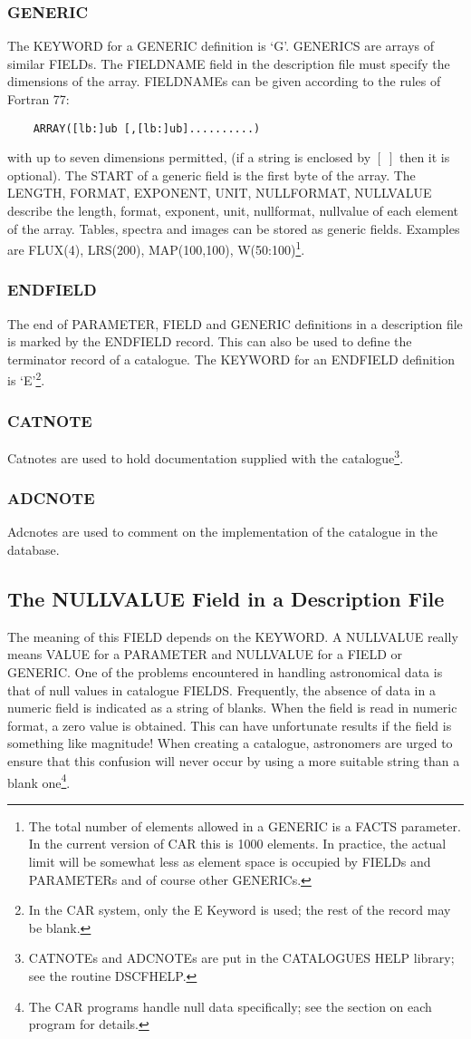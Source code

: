 \subsubsection {GENERIC}
The KEYWORD for a GENERIC definition is `G'.
GENERICS are arrays of similar FIELDs.
The FIELDNAME field in the description file must specify the dimensions of the
array.
FIELDNAMEs can be given according to the rules of Fortran 77:
\begin{verbatim}
    ARRAY([lb:]ub [,[lb:]ub]..........)
\end{verbatim}
with up to seven dimensions permitted, (if a string is enclosed by $[\;]$ then
it is optional).
The START of a generic field is the first byte of the array.
The LENGTH, FORMAT, EXPONENT, UNIT, NULLFORMAT, NULLVALUE describe the length,
format, exponent, unit, nullformat, nullvalue of each element of the array.
Tables, spectra and images can be stored as generic fields.
Examples are FLUX(4), LRS(200), MAP(100,100), W(50:100)\footnote
{The total number of elements allowed in a GENERIC is a FACTS parameter.
In the current version of CAR this is 1000 elements.
In practice, the actual limit will be somewhat less as element space is occupied
by FIELDs and PARAMETERs and of course other GENERICs.}.
\subsubsection {ENDFIELD}
The end of PARAMETER, FIELD and GENERIC definitions in a description file
is marked by the ENDFIELD record.
This can also be used to define the terminator record of a catalogue.
The KEYWORD for an ENDFIELD definition is `E'\footnote
{In the CAR system, only the E Keyword is used; the rest of the record may be
blank.}.
\subsubsection {CATNOTE}
Catnotes are used to hold documentation supplied with the catalogue\footnote
{CATNOTEs and ADCNOTEs are put in the CATALOGUES HELP library; see the
routine DSCFHELP.}.
\subsubsection {ADCNOTE}
Adcnotes are used to comment on the implementation of the catalogue in the
database.
\subsection {The NULLVALUE Field in a Description File}
The meaning of this FIELD depends on the KEYWORD.
A NULLVALUE really means VALUE for a PARAMETER and NULLVALUE for a FIELD or
GENERIC.
One of the problems encountered in handling astronomical data is that of null
values in catalogue FIELDS.
Frequently, the absence of data in a numeric field is indicated as a string of
blanks.
When the field is read in numeric format, a zero value is obtained.
This can have unfortunate results if the field is something like magnitude!
When creating a catalogue, astronomers are urged to ensure that this confusion
will never occur by using a more suitable string than a blank one\footnote
{The CAR programs handle null data specifically; see the section on each
program for details.}.
